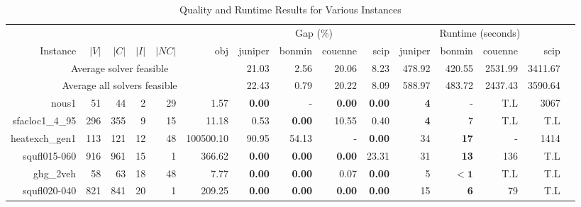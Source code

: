  
\begin{table*}[t] 
\footnotesize 
\caption{Quality and Runtime Results for Various Instances} 
\begin{tabular}{|r|r|r|r|r||r||r|r|r|r||r|r|r|r|r|} 
\hline 
                        &     &       &        &  &   & \multicolumn{4}{c||}{Gap (\%)} &  \multicolumn{4}{c|}{Runtime (seconds)} \\ 
    Instance              & $|V|$& $|C|$& $|I|$& $|NC|$ & obj         & juniper    & bonmin & couenne        & scip            & juniper          & bonmin            & couenne         & scip \\ 
    \hline 
    \hline 
\multicolumn{6}{|c||}{Average solver feasible} & 21.03 & 2.56 & 20.06 & 8.23 & 478.92 & 420.55 & 2531.99 & 3411.67  \\ 
\multicolumn{6}{|c||}{Average all solvers feasible} & 22.43 & 0.79 & 20.22 & 8.09 & 588.97 & 483.72 & 2437.43 & 3590.64 & \\ 
\hline 
\hline 
                            nous1 &           51 &           44 &           2 &           29 &                1.57 &  \textbf{0.00} &             - &  \textbf{0.00} & \textbf{0.00} &   \textbf{4} &                  - &          T.L &         3067 \\ 
                  sfacloc1\_4\_95 &          296 &          355 &           9 &           15 &               11.18 &           0.53 & \textbf{0.00} &          10.55 &          0.40 &   \textbf{4} &                  7 &          T.L &          T.L \\ 
                   heatexch\_gen1 &          113 &          121 &          12 &           48 &           100500.10 &          90.95 &         54.13 &              - & \textbf{0.00} &           34 &        \textbf{17} &            - &         1414 \\ 
                     squfl015-060 &          916 &          961 &          15 &            1 &              366.62 &  \textbf{0.00} & \textbf{0.00} &  \textbf{0.00} &         23.31 &           31 &        \textbf{13} &          136 &          T.L \\ 
                        ghg\_2veh &           58 &           63 &          18 &           48 &                7.77 &  \textbf{0.00} & \textbf{0.00} &           0.07 & \textbf{0.00} &            5 &         $\bm{< 1}$ &          T.L &          T.L \\ 
                     squfl020-040 &          821 &          841 &          20 &            1 &              209.25 &  \textbf{0.00} & \textbf{0.00} &  \textbf{0.00} & \textbf{0.00} &           15 &         \textbf{6} &           79 &          T.L \\ 

\end{tabular}
\end{table*}
